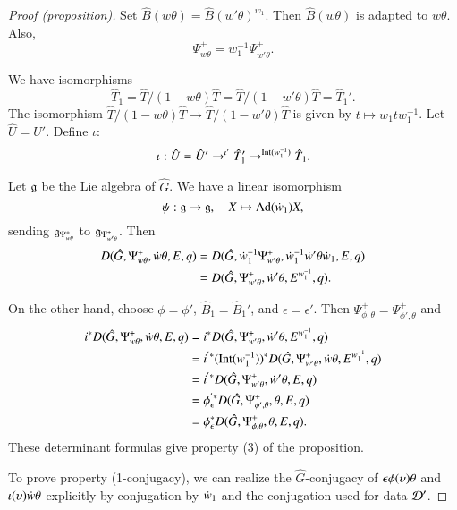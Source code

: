 \begin{proof}[Proof (proposition)]
Set $\hat B(w\theta) = \hat B(w'\theta)^{w_1}$.  Then $\hat B(w\theta)$ is
adapted to $w\theta$.  Also,
\[
\Psi_{w\theta}^+ = w_1^{-1}\Psi_{w'\theta}^+.
\]

We have isomorphisms
\begin{equation}
\hat T_1 = \hat T/(1-w\theta) \hat T 
= \hat T/(1-w' \theta)\hat T  = \hat T_1'.
\end{equation}
The isomorphism $\hat T/(1-w \theta)\hat T\to \hat T/(1-w'\theta)\hat T$
is given by $t \mapsto w_1 t w_1^{-1}$.
Let $\hat U = \hat U'$. %
Define $\iota$:
\[
\iota:\hat U = \hat U' \to^{\iota'} \hat T_1' \to^{{\operatorname{Int}}(w_1^{-1})} \hat T_1.
\]

Let ${\mathfrak g}$ be the Lie algebra of $\hat G$.  We have a linear isomorphism
\[
\psi:{\mathfrak g}\to {\mathfrak g},\quad X\mapsto {\operatorname{Ad}}(\dot w_1) X,
\]
sending ${\mathfrak g}_{\Psi_{w\theta}^+}$  to ${\mathfrak g}_{\Psi_{w'\theta}^+}$. Then
\begin{align*}
D(\hat G,\Psi_{w\theta}^+,\dot w\theta,E,q) &=
D(\hat G,\dot w_1^{-1}\Psi_{w'\theta}^+,\dot w_1^{-1}\dot w'\theta \dot w_1,E,q) \\ &=
D(\hat G,\Psi_{w'\theta}^+,\dot w'\theta,E^{w_1^{-1}},q).
\end{align*}

On the other hand, choose $\phi=\phi'$, $\hat B_1 = \hat B_1'$,
and $\epsilon=\epsilon'$.
Then  $\Psi_{\phi,\theta}^+ =\Psi_{\phi',\theta}^+$ and
\begin{align*}
i^* D(\hat G,\Psi_{w\theta}^+,\dot w\theta,E,q) &=
i^* D(\hat G,\Psi_{w'\theta}^+,\dot w'\theta,E^{w_1^{-1}},q) \\
&=i^{'*} ({\operatorname{Int}} (w_1^{-1}))^* D(\hat G,\Psi_{w'\theta}^+,\dot w\theta,E^{w_1^{-1}},q) \\
&=i^{'*}  D(\hat G,\Psi_{w'\theta}^+,\dot w'\theta,E,q) \\
&=\phi_\epsilon^{'*}  D(\hat G,\Psi_{\phi',\theta}^+,\theta,E,q) \\
&=\phi_\epsilon^{*}  D(\hat G,\Psi_{\phi,\theta}^+,\theta,E,q).
\end{align*}
These determinant formulas give property (3) of the proposition.

To prove property (1-conjugacy), we can realize the $\hat G$-conjugacy
of $\epsilon\phi(\upsilon) \theta$ and $\iota(\upsilon)\dot w\theta$ explicitly by
conjugation by $\dot w_1$ and the conjugation used for data $\mathcal D'$.


\end{proof}
